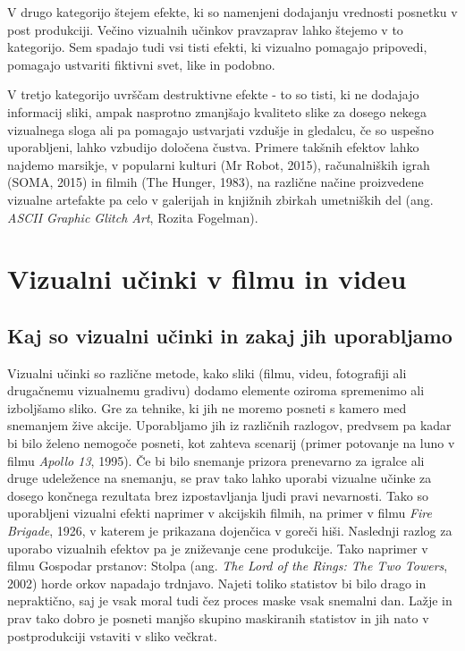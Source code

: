 \documentclass[a4paper, 12pt]{book}
\begin{document}
V drugo kategorijo štejem efekte, ki so namenjeni dodajanju vrednosti posnetku v post produkciji. 
Večino vizualnih učinkov pravzaprav lahko štejemo v to kategorijo. 
Sem spadajo tudi vsi tisti efekti, ki vizualno pomagajo pripovedi, pomagajo ustvariti fiktivni svet, like in podobno. 

V tretjo kategorijo uvrščam destruktivne efekte - to so tisti, ki ne dodajajo informacij sliki, ampak nasprotno zmanjšajo kvaliteto slike za dosego nekega vizualnega sloga ali pa pomagajo ustvarjati vzdušje in gledalcu, če so uspešno uporabljeni, lahko vzbudijo določena čustva. 
Primere takšnih efektov lahko najdemo marsikje, v popularni kulturi (Mr Robot, 2015),
računalniških igrah (SOMA, 2015) 
 in filmih (The Hunger, 1983), 
na različne načine proizvedene vizualne artefakte pa celo v galerijah in knjižnih zbirkah umetniških del (ang. {\it ASCII Graphic Glitch Art}, Rozita Fogelman).



\chapter{Vizualni učinki v filmu in videu}

\section{Kaj so vizualni učinki in zakaj jih uporabljamo}

Vizualni učinki so različne metode, kako sliki (filmu, videu, fotografiji ali drugačnemu vizualnemu gradivu) dodamo elemente oziroma spremenimo ali izboljšamo sliko\cite{vesHandbook}.
Gre za tehnike, ki jih ne moremo posneti s kamero med snemanjem žive  akcije. 
Uporabljamo jih iz različnih razlogov, predvsem pa kadar bi bilo želeno nemogoče posneti, kot zahteva scenarij (primer potovanje na luno v filmu {\it Apollo 13}, 1995).
Če bi bilo snemanje prizora prenevarno za igralce ali druge udeležence na snemanju, se prav tako lahko uporabi vizualne učinke za dosego končnega rezultata brez izpostavljanja ljudi pravi nevarnosti. 
Tako so uporabljeni vizualni efekti naprimer v akcijskih filmih, na primer v filmu {\it Fire Brigade}, 1926, v katerem je prikazana dojenčica v goreči hiši. 
Naslednji razlog za uporabo vizualnih efektov pa je zniževanje cene produkcije. Tako naprimer v filmu Gospodar prstanov: Stolpa (ang. {\it The Lord of the Rings: The Two Towers}, 2002) horde orkov napadajo trdnjavo. Najeti toliko statistov bi bilo drago in nepraktično, saj je vsak moral tudi čez proces maske vsak snemalni dan. Lažje in prav tako dobro je posneti manjšo skupino maskiranih statistov in jih nato v postprodukciji vstaviti v sliko večkrat. 
\end{document}
